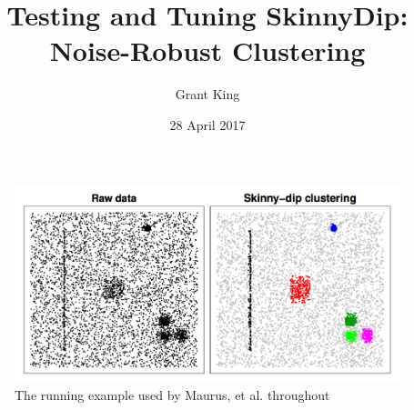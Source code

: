 \documentclass{sig-alternate-05-2015}
\begin{document}


\title{Testing and Tuning SkinnyDip: Noise-Robust Clustering}
\author{
%
%
\alignauthor
Grant King\\
}
\date{28 April 2017}

\maketitle

\begin{figure}[t]
\centering
\includegraphics[width=\textwidth]{images/SkinnyDipExample}
\caption{The running example used by Maurus, et al. throughout \cite{skinnydip}}
\label{fig:sdexample}
\end{figure}
\end{document}
